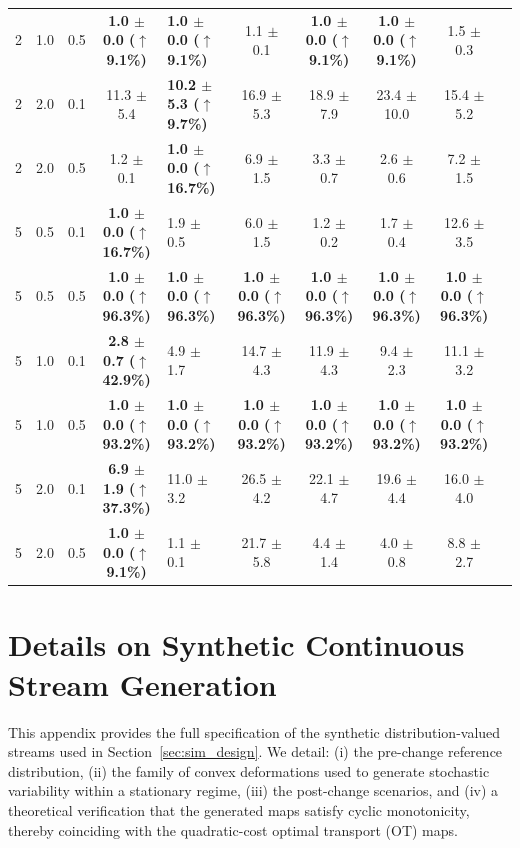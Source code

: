 \documentclass{article}
\theoremstyle{plain}
\theoremstyle{definition}
\theoremstyle{remark}
\begin{document}
\begin{table}[t]
{\begin{tabular}{ccc c G c c c c c}
2 & 1.0 & 0.5 & \textbf{1.0 $\pm$ 0.0 ($\uparrow$9.1\%)} & \textbf{1.0 $\pm$ 0.0 ($\uparrow$9.1\%)} & 1.1 $\pm$ 0.1 & \textbf{1.0 $\pm$ 0.0 ($\uparrow$9.1\%)} & \textbf{1.0 $\pm$ 0.0 ($\uparrow$9.1\%)} & 1.5 $\pm$ 0.3 \\
2 & 2.0 & 0.1 & 11.3 $\pm$ 5.4 & \textbf{10.2 $\pm$ 5.3 ($\uparrow$9.7\%)} & 16.9 $\pm$ 5.3 & 18.9 $\pm$ 7.9 & 23.4 $\pm$ 10.0 & 15.4 $\pm$ 5.2 \\
2 & 2.0 & 0.5 & 1.2 $\pm$ 0.1 & \textbf{1.0 $\pm$ 0.0 ($\uparrow$16.7\%)} & 6.9 $\pm$ 1.5 & 3.3 $\pm$ 0.7 & 2.6 $\pm$ 0.6 & 7.2 $\pm$ 1.5 \\
5 & 0.5 & 0.1 & \textbf{1.0 $\pm$ 0.0 ($\uparrow$16.7\%)} & 1.9 $\pm$ 0.5 & 6.0 $\pm$ 1.5 & 1.2 $\pm$ 0.2 & 1.7 $\pm$ 0.4 & 12.6 $\pm$ 3.5 \\
5 & 0.5 & 0.5 & \textbf{1.0 $\pm$ 0.0 ($\uparrow$96.3\%)} & \textbf{1.0 $\pm$ 0.0 ($\uparrow$96.3\%)} & \textbf{1.0 $\pm$ 0.0 ($\uparrow$96.3\%)} & \textbf{1.0 $\pm$ 0.0 ($\uparrow$96.3\%)} & \textbf{1.0 $\pm$ 0.0 ($\uparrow$96.3\%)} & \textbf{1.0 $\pm$ 0.0 ($\uparrow$96.3\%)} \\
5 & 1.0 & 0.1 & \textbf{2.8 $\pm$ 0.7 ($\uparrow$42.9\%)} & 4.9 $\pm$ 1.7 & 14.7 $\pm$ 4.3 & 11.9 $\pm$ 4.3 & 9.4 $\pm$ 2.3 & 11.1 $\pm$ 3.2 \\
5 & 1.0 & 0.5 & \textbf{1.0 $\pm$ 0.0 ($\uparrow$93.2\%)} & \textbf{1.0 $\pm$ 0.0 ($\uparrow$93.2\%)} & \textbf{1.0 $\pm$ 0.0 ($\uparrow$93.2\%)} & \textbf{1.0 $\pm$ 0.0 ($\uparrow$93.2\%)} & \textbf{1.0 $\pm$ 0.0 ($\uparrow$93.2\%)} & \textbf{1.0 $\pm$ 0.0 ($\uparrow$93.2\%)} \\
5 & 2.0 & 0.1 & \textbf{6.9 $\pm$ 1.9 ($\uparrow$37.3\%)} & 11.0 $\pm$ 3.2 & 26.5 $\pm$ 4.2 & 22.1 $\pm$ 4.7 & 19.6 $\pm$ 4.4 & 16.0 $\pm$ 4.0 \\
5 & 2.0 & 0.5 & \textbf{1.0 $\pm$ 0.0 ($\uparrow$9.1\%)} & 1.1 $\pm$ 0.1 & 21.7 $\pm$ 5.8 & 4.4 $\pm$ 1.4 & 4.0 $\pm$ 0.8 & 8.8 $\pm$ 2.7 \\
\bottomrule
\end{tabular}}
\end{table}



\section{Details on Synthetic Continuous Stream Generation}
\label{app:sim_details_cont}

This appendix provides the full specification of the synthetic distribution-valued streams used in Section~\ref{sec:sim_design}. We detail: (i) the pre-change reference distribution, (ii) the family of convex deformations used to generate stochastic variability within a stationary regime, (iii) the post-change scenarios, and (iv) a theoretical verification that the generated maps satisfy cyclic monotonicity, thereby coinciding with the quadratic-cost optimal transport (OT) maps.
\end{document}
